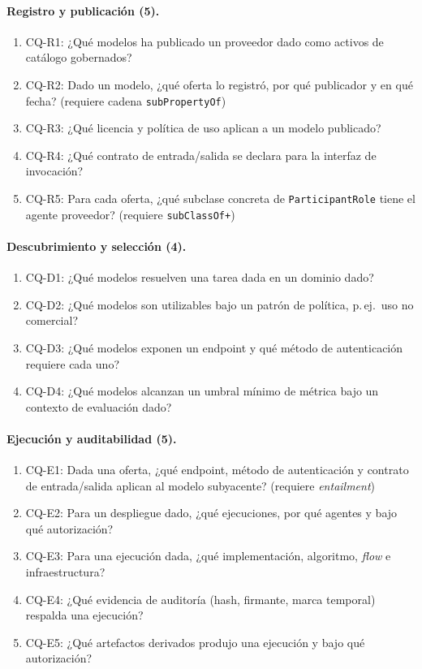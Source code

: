 \documentclass[11pt,a4paper]{article}
\newcommand{\code}[1]{\texttt{#1}}
\newcommand{\cq}[1]{\textsf{#1}}
\begin{document}
\paragraph{Registro y publicación (5).}
\begin{enumerate}[label=\arabic*., leftmargin=*]
\item \cq{CQ-R1}: ¿Qué modelos ha publicado un proveedor dado como activos de catálogo gobernados?
\item \cq{CQ-R2}: Dado un modelo, ¿qué oferta lo registró, por qué publicador y en qué fecha? (requiere cadena \code{subPropertyOf})
\item \cq{CQ-R3}: ¿Qué licencia y política de uso aplican a un modelo publicado?
\item \cq{CQ-R4}: ¿Qué contrato de entrada/salida se declara para la interfaz de invocación?
\item \cq{CQ-R5}: Para cada oferta, ¿qué subclase concreta de \code{ParticipantRole} tiene el agente proveedor? (requiere \code{subClassOf+})
\end{enumerate}

\paragraph{Descubrimiento y selección (4).}
\begin{enumerate}[label=\arabic*., leftmargin=*]
\item \cq{CQ-D1}: ¿Qué modelos resuelven una tarea dada en un dominio dado?
\item \cq{CQ-D2}: ¿Qué modelos son utilizables bajo un patrón de política, p.\,ej.\ uso no comercial?
\item \cq{CQ-D3}: ¿Qué modelos exponen un endpoint y qué método de autenticación requiere cada uno?
\item \cq{CQ-D4}: ¿Qué modelos alcanzan un umbral mínimo de métrica bajo un contexto de evaluación dado?
\end{enumerate}

\paragraph{Ejecución y auditabilidad (5).}
\begin{enumerate}[label=\arabic*., leftmargin=*]
\item \cq{CQ-E1}: Dada una oferta, ¿qué endpoint, método de autenticación y contrato de entrada/salida aplican al modelo subyacente? (requiere \emph{entailment})
\item \cq{CQ-E2}: Para un despliegue dado, ¿qué ejecuciones, por qué agentes y bajo qué autorización?
\item \cq{CQ-E3}: Para una ejecución dada, ¿qué implementación, algoritmo, \emph{flow} e infraestructura?
\item \cq{CQ-E4}: ¿Qué evidencia de auditoría (hash, firmante, marca temporal) respalda una ejecución?
\item \cq{CQ-E5}: ¿Qué artefactos derivados produjo una ejecución y bajo qué autorización?
\end{enumerate}
\end{document}
